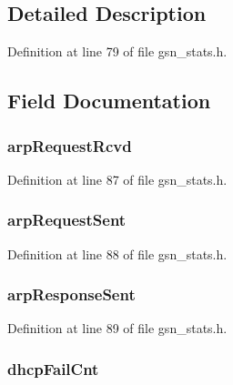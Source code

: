 \subsection{Detailed Description}


Definition at line 79 of file gsn\_\-stats.h.



\subsection{Field Documentation}
\hypertarget{a00176_adf14eda1e1bc8fa9706de4ca43d9bb95}{
\subsubsection[{arpRequestRcvd}]{ {\bf arpRequestRcvd}}}
\label{a00176_adf14eda1e1bc8fa9706de4ca43d9bb95}


Definition at line 87 of file gsn\_\-stats.h.

\hypertarget{a00176_a5019f70fcbe841b145b513f3cc9c156d}{
\subsubsection[{arpRequestSent}]{ {\bf arpRequestSent}}}
\label{a00176_a5019f70fcbe841b145b513f3cc9c156d}


Definition at line 88 of file gsn\_\-stats.h.

\hypertarget{a00176_a5a9875f4c03bf39064614bf9ccf24cb9}{
\subsubsection[{arpResponseSent}]{ {\bf arpResponseSent}}}
\label{a00176_a5a9875f4c03bf39064614bf9ccf24cb9}


Definition at line 89 of file gsn\_\-stats.h.

\hypertarget{a00176_a8bfe92e5f2f56b9c5ccc8f8d9c69146d}{
\subsubsection[{dhcpFailCnt}]{ {\bf dhcpFailCnt}}}
\label{a00176_a8bfe92e5f2f56b9c5ccc8f8d9c69146d}


